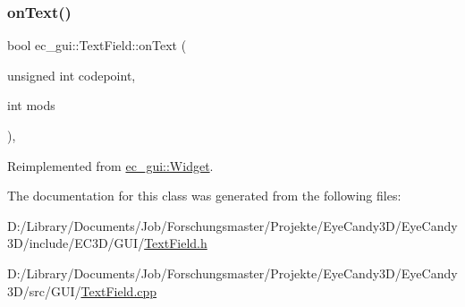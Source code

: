 \subsubsection{\texorpdfstring{on\+Text()}{onText()}}
{\footnotesize\ttfamily bool ec\+\_\+gui\+::\+Text\+Field\+::on\+Text (\begin{DoxyParamCaption}\item[{unsigned int}]{codepoint,  }\item[{int}]{mods }\end{DoxyParamCaption})\hspace{0.3cm}{\ttfamily [override]}, {\ttfamily [virtual]}}



Reimplemented from \mbox{\hyperlink{classec__gui_1_1_widget_a794ce0ee48989a1dbc40cad96a11eb9a}{ec\+\_\+gui\+::\+Widget}}.



The documentation for this class was generated from the following files\+:\begin{DoxyCompactItemize}
\item 
D\+:/\+Library/\+Documents/\+Job/\+Forschungsmaster/\+Projekte/\+Eye\+Candy3\+D/\+Eye\+Candy3\+D/include/\+E\+C3\+D/\+G\+U\+I/\mbox{\hyperlink{_text_field_8h}{Text\+Field.\+h}}\item 
D\+:/\+Library/\+Documents/\+Job/\+Forschungsmaster/\+Projekte/\+Eye\+Candy3\+D/\+Eye\+Candy3\+D/src/\+G\+U\+I/\mbox{\hyperlink{_text_field_8cpp}{Text\+Field.\+cpp}}\end{DoxyCompactItemize}
